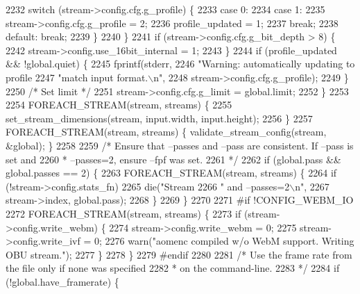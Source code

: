 \begin{DoxyCodeInclude}
{{{{{{{{{{{{{{{{{{{{{{{{{{{{{{{{{{{{{{{{{{{{{{{{{{{{2232         \textcolor{keywordflow}{switch} (stream->config.cfg.g\_profile) \{
2233           \textcolor{keywordflow}{case} 0:
2234           \textcolor{keywordflow}{case} 1:
2235             stream->config.cfg.g\_profile = 2;
2236             profile\_updated = 1;
2237             \textcolor{keywordflow}{break};
2238           \textcolor{keywordflow}{default}: \textcolor{keywordflow}{break};
2239         \}
2240       \}
2241       \textcolor{keywordflow}{if} (stream->config.cfg.g\_bit\_depth > 8) \{
2242         stream->config.use\_16bit\_internal = 1;
2243       \}
2244       \textcolor{keywordflow}{if} (profile\_updated && !global.quiet) \{
2245         fprintf(stderr,
2246                 \textcolor{stringliteral}{"Warning: automatically updating to profile %
2247                 \textcolor{stringliteral}{"match input format.\(\backslash\)n"},
2248                 stream->config.cfg.g\_profile);
2249       \}
2250       \textcolor{comment}{/* Set limit */}
2251       stream->config.cfg.g\_limit = global.limit;
2252     \}
2253 
2254     FOREACH\_STREAM(stream, streams) \{
2255       set\_stream\_dimensions(stream, input.width, input.height);
2256     \}
2257     FOREACH\_STREAM(stream, streams) \{ validate\_stream\_config(stream, &global); \}
2258 
2259     \textcolor{comment}{/* Ensure that --passes and --pass are consistent. If --pass is set and}
2260 \textcolor{comment}{     * --passes=2, ensure --fpf was set.}
2261 \textcolor{comment}{     */}
2262     \textcolor{keywordflow}{if} (global.pass && global.passes == 2) \{
2263       FOREACH\_STREAM(stream, streams) \{
2264         \textcolor{keywordflow}{if} (!stream->config.stats\_fn)
2265           die(\textcolor{stringliteral}{"Stream %
2266               \textcolor{stringliteral}{" and --passes=2\(\backslash\)n"},
2267               stream->index, global.pass);
2268       \}
2269     \}
2270 
2271 \textcolor{preprocessor}{#if !CONFIG\_WEBM\_IO}
2272     FOREACH\_STREAM(stream, streams) \{
2273       \textcolor{keywordflow}{if} (stream->config.write\_webm) \{
2274         stream->config.write\_webm = 0;
2275         stream->config.write\_ivf = 0;
2276         warn(\textcolor{stringliteral}{"aomenc compiled w/o WebM support. Writing OBU stream."});
2277       \}
2278     \}
2279 \textcolor{preprocessor}{#endif}
2280 
2281     \textcolor{comment}{/* Use the frame rate from the file only if none was specified}
2282 \textcolor{comment}{     * on the command-line.}
2283 \textcolor{comment}{     */}
2284     \textcolor{keywordflow}{if} (!global.have\_framerate) \{
}}}}}}}}}}}}}}}}}}}}}}}}}}}}}}}}}}}}}}}}}}}}}}}}}}}}}}
\end{DoxyCodeInclude}
